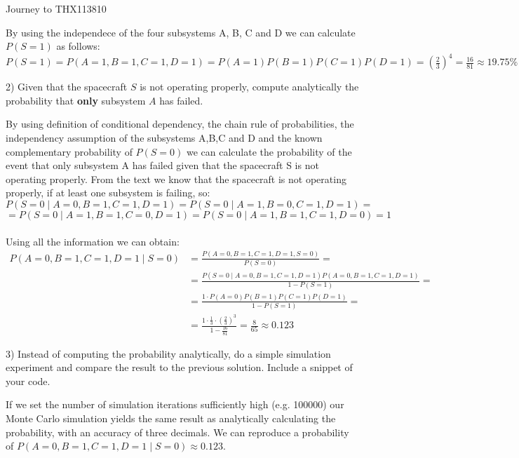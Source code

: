 \begin{questions}
\begin{question}{Journey to THX1138}{10}
\begin{answer}
By using the independece of the four subsystems A, B, C and D we can calculate $P(S=1)$ as follows:\\
$P(S=1)= P(A=1,B=1,C=1,D=1)=P(A=1)P(B=1)P(C=1)P(D=1)=(\frac{2}{3})^{4}= \frac{16}{81} \approx 19.75\%$
\end{answer}
	2) Given that the spacecraft $S$ is not operating properly, compute	analytically the probability that \textbf{only} subsystem $A$ has failed. 
	\\
\begin{answer}
By using definition of conditional dependency, the chain rule of probabilities, the independency assumption of the subsystems A,B,C and D and the known complementary probability of $P(S=0)$ we can calculate the probability of the event that only subsystem A has failed given that the spacecraft S is not operating properly. From the text we know that the spacecraft is not operating properly, if at least one subsystem is failing, so:\\
$P(S=0\mid A=0,B=1,C=1,D=1) = P(S=0\mid A=1,B=0,C=1,D=1) = $\\
$= P(S=0\mid A=1,B=1,C=0,D=1) = P(S=0\mid A=1,B=1,C=1,D=0) = 1$\\ \\
Using all the information we can obtain:
\begin{equation*}
\begin{split}
P(A=0,B=1,C=1,D=1\mid S=0)  
& = \frac{P(A=0,B=1,C=1,D=1,S=0)}{P(S=0)} = \\
& = \frac{P(S=0\mid A=0,B=1,C=1,D=1)P(A=0,B=1,C=1,D=1)}{1-P(S=1)} = \\
& = \frac{1\cdot P(A=0)P(B=1)P(C=1)P(D=1)}{1-P(S=1)} =\\
& = \frac{1\cdot \frac{1}{3}\cdot (\frac{2}{3})^{3}}{1-\frac{16}{81}} = \frac{8}{65} \approx 0.123
\end{split}
\end{equation*}
\end{answer}
	3) Instead of computing the probability analytically, do a simple simulation experiment and compare the result to the previous solution. 
	Include a snippet of your code. 
	\\
\begin{answer}
If we set the number of simulation iterations sufficiently high (e.g. 100000) our Monte Carlo simulation yields the same result as analytically calculating the probability, with an accuracy of three decimals. We can reproduce a probability of $P(A=0,B=1,C=1,D=1\mid S=0)  \approx 0.123$.\\ \\

\end{answer}
\end{question}
\end{questions}
